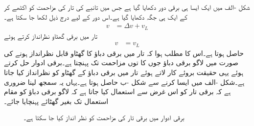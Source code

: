 شکل -الف میں ایک ایسا ہی برقی دور دکھایا گیا ہے جس  میں تانبے کی تار کی مزاحمت کو اکٹھے کر کے ایک ہی جگہ   دکھایا گیا ہے۔اس دور کے لیے درج ذیل لکھا جا سکتا ہے۔
\begin{align}
v&=\Delta v+v_L
\end{align}
تار میں برقی گھٹاو  نظرانداز کرتے ہوئے
\begin{align}
v&=v_L
\end{align}
حاصل ہوتا ہے۔اس کا مطلب ہوا کہ  تار میں برقی دباؤ کا گھٹاو قابل نظرانداز ہونے کی صورت میں لاگو برقی دباؤ جوں کا توں مزاحمت  تک پہنچتا ہے۔برقی ادوار حل کرتے ہوئے یہی حقیقت بروئے کار لاتے ہوئے تار میں برقی دباؤ کے گھٹاو کو نظرانداز کیا جاتا ہے۔شکل -الف میں ایسا کرنے سے  شکل -ب حاصل ہوتا ہے۔یہاں یہ سمجھ لینا ضروری ہے کہ برقی تار کو اس غرض سے استعمال کیا جاتا ہے کہ لاگو برقی دباؤ کو مقام استعمال تک بغیر گھٹائے پہنچایا جائے۔
\begin{figure}
\centering
\begin{subfigure}[b]{0.45\textwidth}
\centering
{}%
\caption{}
\end{subfigure}\hfill
\begin{subfigure}[b]{0.45\textwidth}
\centering
{}%
\caption{}
\end{subfigure}%
\caption{برقی ادوار میں برقی تار کی مزاحمت کو نظر انداز کیا جا سکتا ہے۔}
\label{شکل_مقناطیسی_دور_سلسہ_وار_مزاحمتی_ادوار}
\end{figure}%
